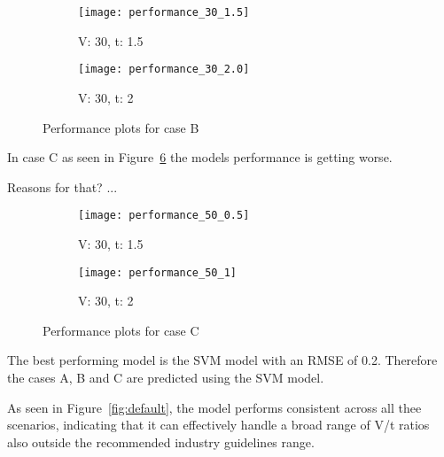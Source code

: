 \begin{figure}[H]
    \begin{tcolorbox}[arc=0pt,boxrule=0.5pt]
        \begin{subfigure}{0.5\textwidth}
            \texttt{[image: performance\_30\_1.5]}
            \caption{V: 30, t: 1.5}
            \label{fig:performance-30_1.5}
        \end{subfigure}
        \hfill
        \begin{subfigure}{0.5\textwidth}
            \texttt{[image: performance\_30\_2.0]}
            \caption{V: 30, t: 2}
            \label{fig:performance-30_2.0}
        \end{subfigure}
    \end{tcolorbox}
    \caption{Performance plots for case B}
    \label{fig:performance-case-b}
\end{figure}

In case C as seen in Figure~\ref{fig:performance-case-c} the models performance is
getting worse.

Reasons for that? ...

\begin{figure}[H]
    \begin{tcolorbox}[arc=0pt,boxrule=0.5pt]
        \begin{subfigure}{0.5\textwidth}
            \texttt{[image: performance\_50\_0.5]}
            \caption{V: 30, t: 1.5}
            \label{fig:performance-30_1.5}
        \end{subfigure}
        \hfill
        \begin{subfigure}{0.5\textwidth}
            \texttt{[image: performance\_50\_1]}
            \caption{V: 30, t: 2}
            \label{fig:performance-30_2.0}
        \end{subfigure}
    \end{tcolorbox}
    \caption{Performance plots for case C}
    \label{fig:performance-case-c}
\end{figure}


The best performing model is the \ac{SVM} model with an \ac{RMSE} of 0.2.
Therefore the cases A, B and C are predicted using the \ac{SVM} model.

As seen in Figure~\ref{fig:default}, the model performs consistent across all thee
scenarios, indicating that it can effectively handle a broad range of V/t ratios also
outside the recommended industry guidelines range.



